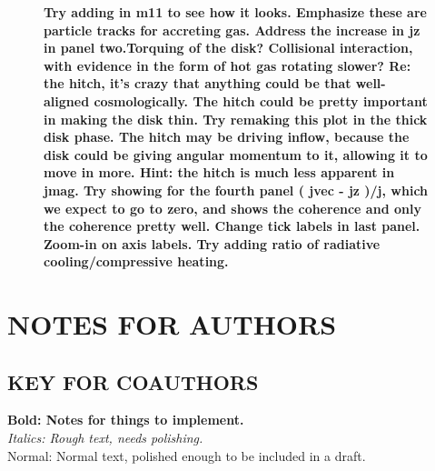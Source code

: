 \documentclass[fleqn,usenatbib]{mnras}
\begin{document}
\begin{figure}
{\textbf{
Try adding in m11 to see how it looks.
Emphasize these are particle tracks for accreting gas.
Address the increase in jz in panel two.Torquing of the disk? Collisional interaction, with evidence in the form of hot gas rotating slower?
Re: the hitch, it's crazy that anything could be that well-aligned cosmologically. The hitch could be pretty important in making the disk thin. Try remaking this plot in the thick disk phase.
The hitch may be driving inflow, because the disk could be giving angular momentum to it, allowing it to move in more.
Hint: the hitch is much less apparent in jmag.
Try showing for the fourth panel ( jvec - jz )/j, which we expect to go to zero, and shows the coherence and only the coherence pretty well.
Change tick labels in last panel.
Zoom-in on axis labels.
Try adding ratio of radiative cooling/compressive heating.
}
}
\label{f: before and after}
\end{figure}



\section{NOTES FOR AUTHORS}

\subsection{KEY FOR COAUTHORS}
\textbf{Bold: Notes for things to implement.} \\
\textit{Italics: Rough text, needs polishing.} \\
Normal: Normal text, polished enough to be included in a draft.
\end{document}
